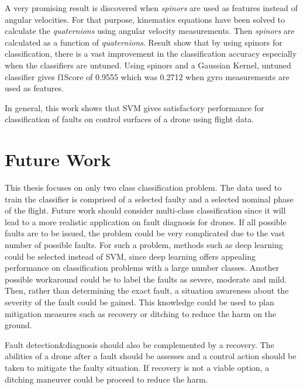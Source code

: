 A very promising result is discovered when \emph{spinors} are used as features instead of angular velocities. 
For that purpose, kinematics equations have been solved to calculate the \emph{quaternions} using angular velocity measurements. Then \emph{spinors} are calculated as a function of \emph{quaternions}. Result show that by using spinors for classification, there is a vast improvement in the classification accuracy especially when the classifiers are untuned. Using spinors and a Gaussian Kernel, untuned classifier gives f1Score of 0.9555 which was 0.2712 when gyro measurements are used as features.

In general, this work shows that SVM gives satisfactory performance for classification of faults on control surfaces of a drone using flight data.

\section{Future Work}

This thesis focuses on only two class classification problem. 
The data used to train the classifier is comprised of a selected faulty and a selected nominal phase of the flight. 
Future work should consider multi-class classification since it will lead to a more realistic application on fault diagnosis for drones. 
If all possible faults are to be issued, the problem could be very complicated due to the vast number of possible faults. 
For such a problem, methods such as deep learning could be selected instead of SVM, since deep learning offers appealing performance on classification problems with a large number classes. 
Another possible workaround could be to label the faults as severe, moderate and mild. 
Then, rather than determining the exact fault, a situation awareness about the severity of the fault could be gained. 
This knowledge could be used to plan mitigation measures such as recovery or ditching to reduce the harm on the ground.

Fault detection\&diagnosis should also be complemented by a recovery. The abilities of a drone after a fault should be assesses and a control action should be taken to mitigate the faulty situation. If recovery is not a viable option, a ditching maneuver could be proceed to reduce the harm.
